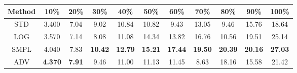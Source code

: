 \documentclass{standalone}
\begin{document}
\begin{tabular}{c|cccccccccc}
      \toprule
      Method & 10\% & 20\% & 30\% & 40\% & 50\% & 60\% & 70\% & 80\% & 90\% & 100\% \\
      \midrule
STD & 3.400 & 7.04 & 9.02 & 10.84 & 10.82 & 9.43 & 13.05 & 9.46 & 15.76 & 18.64\\
LOG & 3.570 & 7.14 & 8.08 & 11.08 & 14.34 & 13.82 & 16.76 & 10.56 & 19.51 & 25.14\\
SMPL & 4.040 & 7.83 & \textbf{10.42} & \textbf{12.79} & \textbf{15.21} & \textbf{17.44} & \textbf{19.50} & \textbf{20.39} & \textbf{20.16} & \textbf{27.03}\\
ADV & \textbf{4.370} & \textbf{7.91} & 9.46 & 11.00 & 11.13 & 11.45 & 8.63 & 18.16 & 15.58 & 21.42\\
  \bottomrule
\end{tabular}
\end{document}
